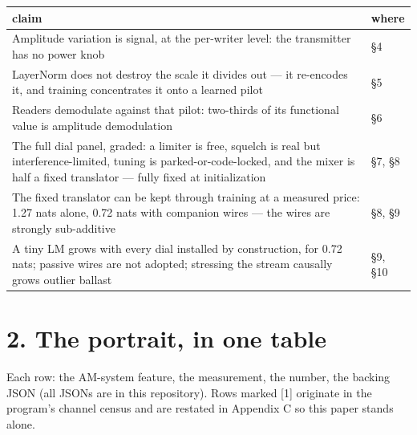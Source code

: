 \documentclass[10pt]{article}
\begin{document}
\begin{center}\small\begin{tabular}{ll}
\toprule
claim & where \\
\midrule
\parbox[t]{0.46\linewidth}{Amplitude variation is signal, at the per-writer level: the transmitter has no power knob} & §4 \\
\parbox[t]{0.46\linewidth}{LayerNorm does not destroy the scale it divides out --- it re-encodes it, and training concentrates it onto a learned pilot} & §5 \\
\parbox[t]{0.46\linewidth}{Readers demodulate against that pilot: two-thirds of its functional value is amplitude demodulation} & §6 \\
\parbox[t]{0.46\linewidth}{The full dial panel, graded: a limiter is free, squelch is real but interference-limited, tuning is parked-or-code-locked, and the mixer is half a fixed translator --- fully fixed at initialization} & §7, §8 \\
\parbox[t]{0.46\linewidth}{The fixed translator can be kept through training at a measured price: 1.27 nats alone, 0.72 nats with companion wires --- the wires are strongly sub-additive} & §8, §9 \\
\parbox[t]{0.46\linewidth}{A tiny LM grows with every dial installed by construction, for 0.72 nats; passive wires are not adopted; stressing the stream causally grows outlier ballast} & §9, §10 \\
\bottomrule
\end{tabular}\end{center}

\section{2. The portrait, in one table}

Each row: the AM-system feature, the measurement, the number, the backing JSON (all JSONs are in
this repository). Rows marked [1] originate in the program's channel census and are restated in
Appendix C so this paper stands alone.
\end{document}

